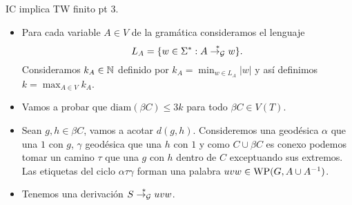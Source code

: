 \documentclass[aspectratio=169, 11pt]{beamer}
\begin{document}
	\begin{frame}[fragile]{IC implica TW finito pt 3.}
		\begin{itemize}
			\item 
				Para cada variable $A \in V$ de la gramática consideramos el lenguaje 
				\[
				L_A = \{ w \in \Sigma^* : A \overset{*}{\to_{\cal G}} w  \}.
				\]
				Consideramos $k_A \in \mathbb{N}$ definido por $k_A = {\min}_{w \in L_A} |w|$ y así definimos $k = \max_{A \in V} k_A$.
				
			\item  
				Vamos a probar que $\text{diam}(\beta C) \le 3k$ para todo $\beta C \in V(T)$.
				
			\item 
				Sean $g,h \in \beta C$, vamos a acotar $d(g,h)$. 
				Consideremos una geodésica $\alpha$ que una $1$ con $g$, $\gamma$ geodésica que una $h$ con $1$ y como $C \cup \beta C$ es conexo podemos tomar un camino $\tau$ que una $g$ con $h$ dentro de $C$ exceptuando sus extremos. 
				Las etiquetas del ciclo $\alpha \tau \gamma$ forman una palabra $ uvw \in \text{WP}(G, A \cup A^{-1})$.
			
			\item 
				Tenemos una derivación $S \overset{*}{\to_{\cal G}} uvw$.
				
				
		\end{itemize}
	\end{frame}
	
	
	
	
	
\end{document}
